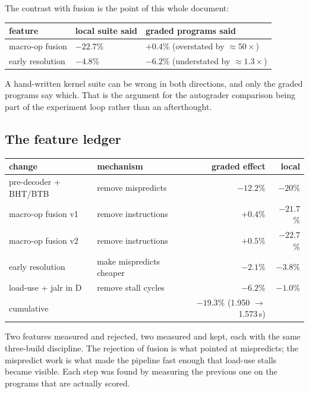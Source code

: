 \documentclass[11pt]{article}
\begin{document}
The contrast with fusion is the point of this whole document:

\begin{center}
\begin{tabular}{lll}
\toprule
feature & local suite said & graded programs said \\
\midrule
macro-op fusion & $-22.7$\% & $+0.4$\% (overstated by $\approx 50\times$) \\
early resolution & $-4.8$\% & $-6.2$\% (understated by $\approx 1.3\times$) \\
\bottomrule
\end{tabular}
\end{center}

A hand-written kernel suite can be wrong in both directions, and only the graded programs say
which. That is the argument for the autograder comparison being part of the experiment loop
rather than an afterthought.

\subsection{The feature ledger}

\begin{center}
\begin{tabular}{llrr}
\toprule
change & mechanism & graded effect & local \\
\midrule
pre-decoder + BHT/BTB & remove mispredicts & $-12.2$\% & $-20$\% \\
macro-op fusion v1    & remove instructions & $+0.4$\% & $-21.7$\% \\
macro-op fusion v2    & remove instructions & $+0.5$\% & $-22.7$\% \\
early resolution      & make mispredicts cheaper & $-2.1$\% & $-3.8$\% \\
load-use + jalr in D  & remove stall cycles & $\mathbf{-6.2}$\% & $-1.0$\% \\
\midrule
cumulative            & & $\mathbf{-19.3}$\% (1.950 $\rightarrow$ 1.573\,s) & \\
\bottomrule
\end{tabular}
\end{center}

Two features measured and rejected, two measured and kept, each with the same three-build
discipline. The rejection of fusion is what pointed at mispredicts; the mispredict work is what
made the pipeline fast enough that load-use stalls became visible. Each step was found by
measuring the previous one on the programs that are actually scored.
\end{document}
